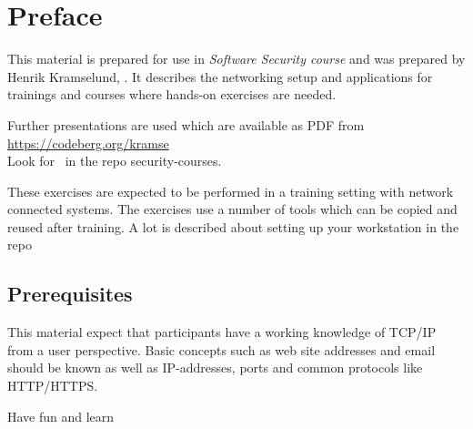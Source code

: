 \documentclass[a4paper,11pt,notitlepage]{report}
\begin{document}
\rm
{}

\newcommand{\subject}[1]{Software Security course}
\newcommand{\kursus}[1]{Software Security course}
\newcommand{\kursusnavn}[1]{Software Security course\\ exercises}



\setcounter{tocdepth}{0}

\normal

{\color{titlecolor}\tableofcontents}

\normal
\pagestyle{fancyplain}
\chapter*{\color{titlecolor}Preface}

This material is prepared for use in \emph{Software Security course} and was prepared by
Henrik Kramselund,  .
It describes the networking setup and
applications for trainings and courses where hands-on exercises are needed.

Further presentations are used which are available as PDF from \url{https://codeberg.org/kramse}\\
Look for \jobname\ in the repo security-courses.

These exercises are expected to be performed in a training setting with network connected systems. The exercises use a number of tools which can be copied and reused after training. A lot is described about setting up your workstation in the repo



\section*{\color{titlecolor}Prerequisites}

This material expect that participants have a working knowledge of
TCP/IP from a user perspective. Basic concepts such as web site addresses and email should be known as well as IP-addresses, ports and common protocols like HTTP/HTTPS.

\vskip 1cm
Have fun and learn
\eject

\rhead{\fancyplain{}{\bf \chaptername\ \thechapter}}
\end{document}
